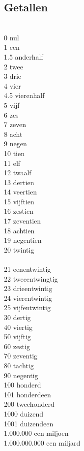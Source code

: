 \documentclass[a4paper,14pt]{extarticle}
\begin{document}
\subsection{Getallen}
\begin{paracol}{2}
\hfill \\
0 nul \\
1 een \\
1.5 anderhalf \\
2 twee \\
3 drie \\
4 vier \\
4.5 vierenhalf \\
5 vijf \\
6 zes \\
7 zeven \\
8 acht \\
9 negen \\
10 tien \\
11 elf \\
12 twaalf \\
13 dertien \\
14 veertien \\
15 vijftien \\
16 zestien \\
17 zeventien \\
18 achtien \\
19 negentien \\
20 twintig \\
\switchcolumn
\hfill \\
21 eenentwintig \\
22 tweeentwingtig \\
23 drieentwintig \\
24 vierentwintig \\
25 vijfentwintig \\
30 dertig \\
40 viertig \\
50 vijftig \\
60 zestig \\
70 zeventig \\
80 tachtig \\
90 negentig \\
100 honderd \\
101 honderdeen \\
200 tweehonderd \\
1000 duizend \\
1001 duizendeen \\
1.000.000 een miljoen \\
1.000.000.000 een miljard \\
\end{paracol}
\end{document}
